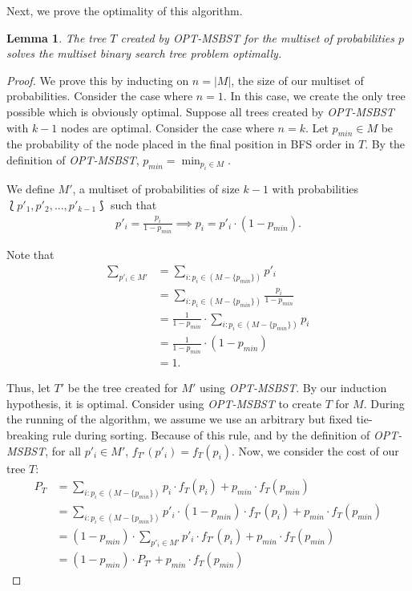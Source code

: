 \documentclass[letterpaper,12pt,titlepage,oneside,final]{book}
\theoremstyle{plain}
\newtheorem{lem}[thm]{Lemma}
\begin{document}
Next, we prove the optimality of this algorithm. 

\begin{lem}\label{MSSolvesOpt}
The tree $T$ created by \textit{OPT-MSBST} for the multiset of probabilities $p$ solves the multiset binary search tree problem optimally.
\end{lem}

\begin{proof}
We prove this by inducting on $n = |M|$, the size of our multiset of probabilities. Consider the case where $n = 1$. In this case, we create the only tree possible which is obviously optimal. Suppose all trees created by \textit{OPT-MSBST} with $k-1$ nodes are optimal. Consider the case where $n=k$. Let $p_{min} \in M$ be the probability of the node placed in the final position in BFS order in $T$. By the definition of \textit{OPT-MSBST}, $p_{min}=\min_{p_i \in M}$.

\noindent We define $M'$, a multiset of probabilities of size $k-1$ with probabilities $\lbag p'_1, p'_2, ..., p'_{k-1} \rbag$ such that
\begin{align*}
p'_i=\frac{p_i}{1-p_{min}} \implies p_i = p'_i\cdot (1-p_{min}).
\end{align*}

\noindent Note that
\begin{align*}
\sum\limits_{p'_i \in M'} &= \sum_{i : p_i \in (M - \{p_{min}\})}p'_i\\
 &= \sum_{i : p_i \in (M - \{p_{min}\})}\frac{p_i}{1-p_{min}}\\
 &= \frac{1}{1-p_{min}}\cdot \sum_{i : p_i \in (M - \{p_{min}\})}p_i\\
 &= \frac{1}{1-p_{min}}\cdot (1-p_{min})\\
&= 1.
\end{align*}

Thus, let $T'$ be the tree created for $M'$ using \textit{OPT-MSBST}. By our induction hypothesis, it is optimal. Consider using \textit{OPT-MSBST} to create $T$ for $M$. During the running of the algorithm, we assume  we use an arbitrary but fixed tie-breaking rule during sorting. Because of this rule, and by the definition of \textit{OPT-MSBST}, for all $p'_i \in M'$, $f_{T'}(p'_i)=f_T(p_i)$. Now, we consider the cost of our tree $T$:
\begin{align*}
P_T &= \sum_{i:p_i \in (M - \{p_{min}\})} p_i\cdot f_T(p_i) + p_{min}\cdot f_T(p_{min}) \\
&= \sum_{i:p_i \in (M - \{p_{min}\})} p'_i\cdot (1-p_{min})\cdot f_{T'}(p_i) + p_{min}\cdot f_T(p_{min}) \\
&= (1-p_{min})\cdot \sum_{p'_i \in M'} p'_i\cdot f_{T'}(p_i) + p_{min}\cdot f_T(p_{min}) \\
&= (1-p_{min})\cdot P_{T'} + p_{min}\cdot f_T(p_{min})
\end{align*}




\end{proof}
\end{document}
